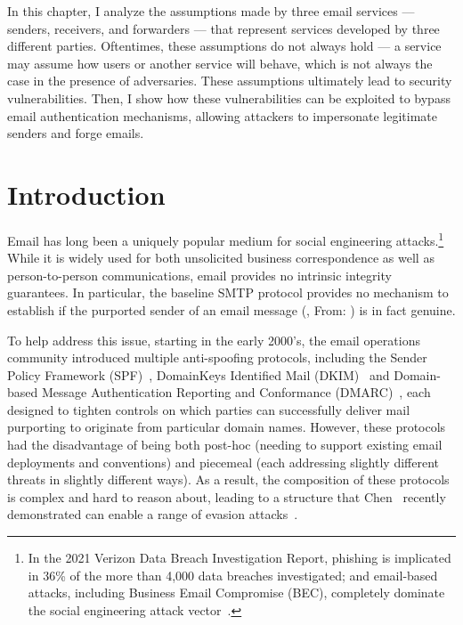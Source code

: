In this chapter, I analyze the assumptions made by three email services --- senders, receivers, and forwarders --- that
represent services developed by three different parties. 
Oftentimes, these assumptions do not always hold --- a service may assume how users or another service will behave, which is not always the case in the presence of adversaries.
These assumptions ultimately lead to security vulnerabilities. Then, I show how these vulnerabilities can be exploited to bypass email authentication
mechanisms, allowing attackers to impersonate legitimate senders and forge emails.

\section{Introduction}
Email has long been a uniquely popular medium for social engineering
attacks.\footnote{In the 2021 Verizon Data Breach Investigation
  Report, phishing is implicated in 36\% of the more than 4,000 data
  breaches investigated; and email-based attacks, including Business
  Email Compromise (BEC), completely dominate the social engineering
  attack vector~\cite{dbir2021}.}  While it is widely used for
both unsolicited business correspondence as well as person-to-person
communications, email provides no intrinsic integrity guarantees.  In
particular, the baseline SMTP protocol provides no mechanism to
establish if the purported sender of an email message (\eg, From:
) is in fact genuine.

To help address this issue, starting in the early 2000's, the email
operations community introduced multiple anti-spoofing protocols,
including the Sender Policy Framework (SPF)~\cite{rfc7208}, DomainKeys
Identified Mail
(DKIM)~\cite{rfc6376} and Domain-based Message Authentication
Reporting and Conformance (DMARC)~\cite{rfc7489}, each designed to
tighten controls on which parties can successfully deliver
mail purporting to originate from particular domain names.  However,
these protocols had the disadvantage of being both post-hoc (needing
to support existing email deployments and conventions) and piecemeal
(each addressing slightly different threats in slightly different
ways).  As a result, the composition of these protocols is complex and
hard to reason about, leading to a structure that Chen \etal\ recently
demonstrated can enable a range of evasion
attacks~\cite{chen2020composition}.

